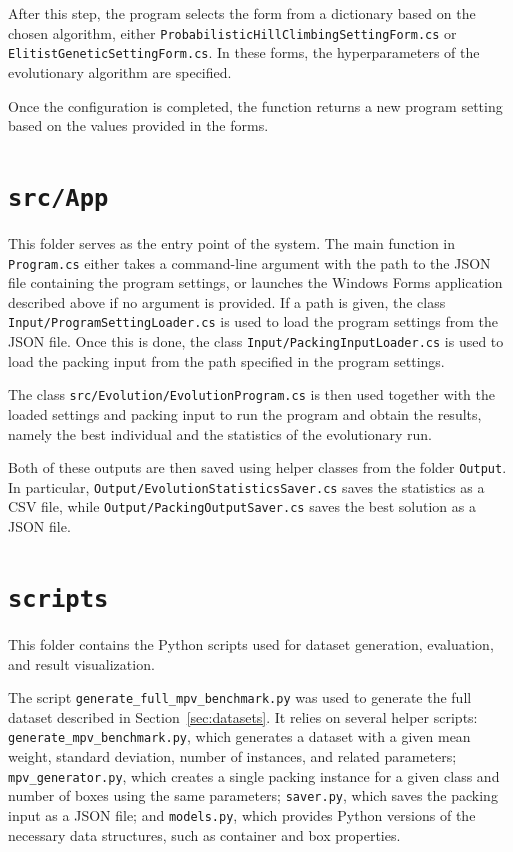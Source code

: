 After this step, the program selects the form from a dictionary based on the chosen algorithm, either 
\texttt{ProbabilisticHillClimbingSettingForm.cs} or 
\texttt{ElitistGeneticSettingForm.cs}. 
In these forms, the hyperparameters of the evolutionary algorithm are specified.

Once the configuration is completed, the function returns a new program setting based on the values provided in the forms.

\section{\texttt{src/App}}

This folder serves as the entry point of the system.
The main function in \texttt{Program.cs} either takes a command-line argument 
with the path to the JSON file containing the program settings, or launches the Windows Forms 
application described above if no argument is provided. If a path is given, 
the class \texttt{Input/ProgramSettingLoader.cs} is used to load the program settings 
from the JSON file. Once this is done, the class \texttt{Input/PackingInputLoader.cs} 
is used to load the packing input from the path specified in the program settings.

The class \texttt{src/Evolution/EvolutionProgram.cs} is then used together with 
the loaded settings and packing input to run the program and obtain the results, 
namely the best individual and the statistics of the evolutionary run.

Both of these outputs are then saved using helper classes from the folder \texttt{Output}. 
In particular, \texttt{Output/EvolutionStatisticsSaver.cs} saves the statistics as a CSV file, 
while \texttt{Output/PackingOutputSaver.cs} saves the best solution as a JSON file.

\section{\texttt{scripts}}
\label{app:scripts}

This folder contains the Python scripts used for dataset generation, evaluation, and result visualization.

The script \texttt{generate\_full\_mpv\_benchmark.py} was used to generate the full dataset described in Section~\ref{sec:datasets}. 
It relies on several helper scripts:\\ 
\texttt{generate\_mpv\_benchmark.py}, which generates a dataset with a given mean weight, standard deviation, number of instances, and related parameters; 
\\\texttt{mpv\_generator.py}, which creates a single packing instance for a given class and number of boxes using the same parameters; 
\texttt{saver.py}, which saves the packing input as a JSON file; and 
\texttt{models.py}, which provides Python versions of the necessary data structures, such as container and box properties.

